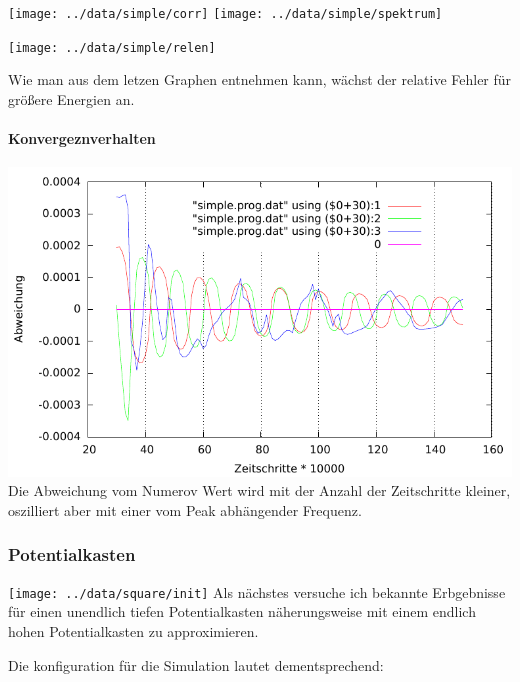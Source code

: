 \documentclass[10pt,a4paper,german]{scrartcl}
\begin{document}
		  	\texttt{[image: ../data/simple/corr]}
    		\texttt{[image: ../data/simple/spektrum]}
    		
			  \begin{center}\end{center}
  			
	  		\texttt{[image: ../data/simple/relen]}
		  	
			  Wie man aus dem letzen Graphen entnehmen kann, wächst
  			der relative Fehler für größere Energien an.
  			
  			\paragraph*{Konvergeznverhalten}
  			  \includegraphics[scale=.62]{../static/simple_konv.pdf}
  			  Die Abweichung vom Numerov Wert wird mit der Anzahl der
  			  Zeitschritte kleiner, oszilliert aber
  			  mit einer vom Peak abhängender Frequenz.
			
  	  \subsubsection{Potentialkasten}
  			\texttt{[image: ../data/square/init]}
  			Als nächstes versuche ich bekannte Erbgebnisse für einen
	  		unendlich tiefen Potentialkasten näherungsweise mit einem
	  		endlich hohen  Potentialkasten zu approximieren.
	  		
	  		Die konfiguration für die Simulation lautet dementsprechend:
				
				
\end{document}
